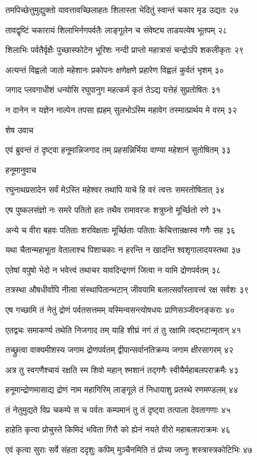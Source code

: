 तमपिच्छेत्तुमुद्युक्तो यावत्तावच्छिलाहतः
शिलास्ता भेदितुं स्वान्तं चकार मृड उद्यतः २७

तावद्वृष्टिं चकारायं शिलाभिर्नगपर्वतैः
लाङ्गूलेन च संवेष्ट्य ताडयत्येष भूतपम् २८

शिलाभिः पर्वतैर्वृक्षैः पुच्छास्फोटेन भूरिशः
नन्दी प्राप्तो महात्रासं चन्द्रोऽपि शकलीकृतः २९

अत्यन्तं विह्वलो जातो महेशानः प्रकोपनः
क्षणेक्षणे प्रहारेण विह्वलं कुर्वतं भृशम् ३०

जगाद प्लवगाधीशं धन्योसि रघुपानुग
महत्कर्म कृतं तेऽद्य यत्तेहं सुप्रतोषितः ३१

न दानेन न यज्ञेन नाल्पेन तपसा ह्यहम्
सुलभोऽस्मि महावेग तस्मात्प्रार्थय मे वरम् ३२

शेष उवाच

एवं ब्रुवन्तं तं दृष्ट्वा हनूमान्निजगाद तम्
प्रहसन्निर्भिया वाण्या महेशानं सुतोषितम् ३३

हनूमानुवाच

रघुनाथप्रसादेन सर्वं मेऽस्ति महेश्वर
तथापि याचे हि वरं त्वत्तः समरतोषितात् ३४

एष पुष्कलसंज्ञो नः समरे पतितो हतः
तथैव रामावरजः शत्रुघ्नो मूर्च्छितो रणे ३५

अन्ये च वीरा बहवः पतिताः शरविक्षताः
मूर्च्छिताः पतिताः केचित्तान्रक्षस्व गणैः सह ३६

यथा चैतान्महाभूता वेतालाश्च पिशाचकाः
न हरन्ति न खादन्ति श्वशृगालादयस्तथा ३७

एतेषां वपुषो भेदो न भवेत्त्वं तथाचर
यावदिन्द्रगणं जित्वा न यामि द्रोणपर्वतम् ३८

तत्रस्था औषधीर्वापि नीत्वा संस्थापितान्भटान्
जीवयामि बलात्सर्वांस्तावत्त्वं रक्ष सर्वशः ३९

एष गच्छामि तं नेतुं द्रोणं पर्वतसत्तमम्
यस्मिन्वसन्त्योषधयः प्राणिसञ्जीवनङ्कराः ४०

एतद्वचः समाकर्ण्य तथेति निजगाद तम्
याहि शीघ्रं नगं तं तु रक्षामि त्वद्भटान्मृतान् ४१

तच्छ्रुत्वा वाक्यमीशस्य जगाम द्रोणपर्वतम्
द्वीपान्सर्वानतिक्रम्य जगाम क्षीरसागरम् ४२

अत्र तु स्वगणैश्चायं रक्षति स्म शिवो महान्
श्मशानं तद्गणैः स्वीयैर्महाबलपराक्रमैः ४३

हनूमान्द्रोणमासाद्य द्रोणं नाम महागिरिम्
लाङ्गूले तं निधायाशु प्रतस्थे रणमण्डलम् ४४

तं नेतुमुद्यते विप्र चकम्पे स च पर्वतः
कम्पमानं तु तं दृष्ट्वा तत्पाला देवतागणाः ४५

हाहेति कृत्वा प्रोचुस्ते किमिदं भविता गिरौ
को ह्येनं नयते वीरो महाबलपराक्रमः ४६

एवं कृत्वा सुराः सर्वे संहता ददृशुः कपिम्
मुञ्चैनमिति तं प्रोच्य जघ्नुः शस्त्रास्त्रकोटिभिः ४७

